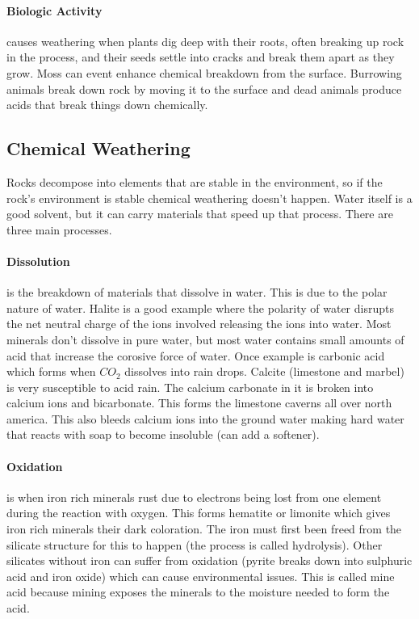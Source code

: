 \documentclass{article}
\begin{document}
\paragraph{Biologic Activity} %
\label{par:biologic_activity}
causes weathering when plants dig deep with their roots, often breaking up rock in the process, and their seeds settle into cracks and break them apart as they grow. Moss can event enhance chemical breakdown from the surface. Burrowing animals break down rock by moving it to the surface and dead animals produce acids that break things down chemically.

\subsection{Chemical Weathering} %
\label{sub:chemical_weathering}
Rocks decompose into elements that are stable in the environment, so if the rock's environment is stable chemical weathering doesn't happen. Water itself is a good solvent, but it can carry materials that speed up that process. There are three main processes.

\paragraph{Dissolution} %
\label{par:dissolution}
is the breakdown of materials that dissolve in water. This is due to the polar nature of water. Halite is a good example where the polarity of water disrupts the net neutral charge of the ions involved releasing the ions into water. Most minerals don't dissolve in pure water, but most water contains small amounts of acid that increase the corosive force of water. Once example is carbonic acid which forms when $CO_2$ dissolves into rain drops. Calcite (limestone and marbel) is very susceptible to acid rain. The calcium carbonate in it is broken into calcium ions and bicarbonate. This forms the limestone caverns all over north america. This also bleeds calcium ions into the ground water making hard water that reacts with soap to become insoluble (can add a softener).

\paragraph{Oxidation} %
\label{par:oxidation}
is when iron rich minerals rust due to electrons being lost from one element during the reaction with oxygen.  This forms hematite or limonite which gives iron rich minerals their dark coloration. The iron must first been freed from the silicate structure for this to happen (the process is called hydrolysis). Other silicates without iron can suffer from oxidation (pyrite breaks down into sulphuric acid and iron oxide) which can cause environmental issues. This is called mine acid because mining exposes the minerals to the moisture needed to form the acid.
\end{document}
